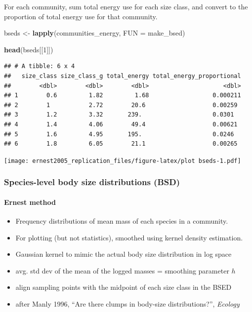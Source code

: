 \documentclass[]{article}
\newenvironment{Shaded}{\begin{snugshade}}{\end{snugshade}}
\newcommand{\KeywordTok}[1]{\textcolor[rgb]{0.13,0.29,0.53}{\textbf{#1}}}
\newcommand{\DataTypeTok}[1]{\textcolor[rgb]{0.13,0.29,0.53}{#1}}
\newcommand{\DecValTok}[1]{\textcolor[rgb]{0.00,0.00,0.81}{#1}}
\newcommand{\StringTok}[1]{\textcolor[rgb]{0.31,0.60,0.02}{#1}}
\newcommand{\NormalTok}[1]{#1}
\providecommand{\tightlist}{%
  \setlength{\itemsep}{0pt}\setlength{\parskip}{0pt}}
\let\oldparagraph\paragraph
\renewcommand{\paragraph}[1]{\oldparagraph{#1}\mbox{}}
\begin{document}
For each community, sum total energy use for each size class, and
convert to the proportion of total energy use for that community.

\begin{Shaded}
\begin{Highlighting}[]
\NormalTok{bseds <-}\StringTok{ }\KeywordTok{lapply}\NormalTok{(communities_energy, }\DataTypeTok{FUN =}\NormalTok{ make_bsed)}

\KeywordTok{head}\NormalTok{(bseds[[}\DecValTok{1}\NormalTok{]])}
\end{Highlighting}
\end{Shaded}

\begin{verbatim}
## # A tibble: 6 x 4
##   size_class size_class_g total_energy total_energy_proportional
##        <dbl>        <dbl>        <dbl>                     <dbl>
## 1        0.6         1.82         1.68                  0.000211
## 2        1           2.72        20.6                   0.00259 
## 3        1.2         3.32       239.                    0.0301  
## 4        1.4         4.06        49.4                   0.00621 
## 5        1.6         4.95       195.                    0.0246  
## 6        1.8         6.05        21.1                   0.00265
\end{verbatim}

\texttt{[image: ernest2005\_replication\_files/figure-latex/plot bseds-1.pdf]}

\subsubsection{Species-level body size distributions
(BSD)}\label{species-level-body-size-distributions-bsd}

\paragraph{Ernest method}\label{ernest-method-1}

\begin{itemize}
\tightlist
\item
  Frequency distributions of mean mass of each species in a community.
\item
  For plotting (but not statistics), smoothed using kernel density
  estimation.
\item
  Gaussian kernel to mimic the actual body size distribution in log
  space
\item
  avg. std dev of the mean of the logged masses = smoothing parameter
  \(h\)
\item
  align sampling points with the midpoint of each size class in the BSED
\item
  after Manly 1996, ``Are there clumps in body-size distributions?'',
  \emph{Ecology}
\end{itemize}
\end{document}
